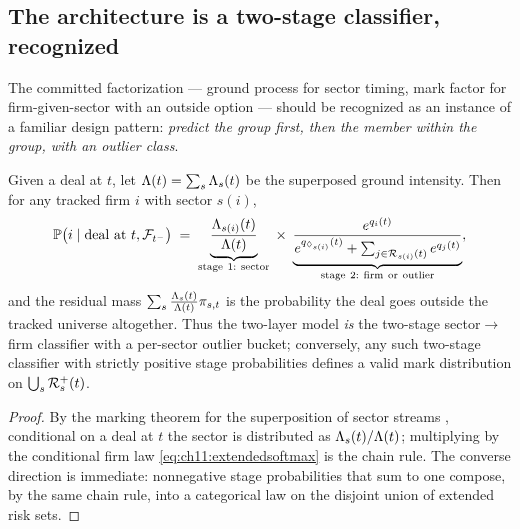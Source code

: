 \subsection{The architecture is a two-stage classifier, recognized}\label{ch11:sec:twostage}

The committed factorization --- ground process for sector timing, mark
factor for firm-given-sector with an outside option --- should be
recognized as an instance of a familiar design pattern: \emph{predict the
group first, then the member within the group, with an outlier class}.

\begin{proposition}\label{prop:ch11:twostage}
Given a deal at $t$, let $\Lambda(t) = \sum_{s} \Lambda_s(t)$ be the
superposed ground intensity. Then for any tracked firm $i$ with sector
$s(i)$,
\begin{equation}\label{eq:ch11:chain}
\mathbb{P}\big(i \mid \mathrm{deal\ at\ } t, \mathcal{F}_{t^-}\big)
 \;=\;
 \underbrace{\frac{\Lambda_{s(i)}(t)}{\Lambda(t)}}_{\mathrm{stage\ 1:\ sector}}
 \;\times\;
 \underbrace{\frac{e^{q_i(t)}}
   {e^{q_{\lozenge_{s(i)}}(t)} + \sum_{j\in\mathcal{R}_{s(i)}(t)} e^{q_j(t)}}}_{\mathrm{stage\ 2:\ firm\ or\ outlier}},
\end{equation}
and the residual mass $\sum_s \frac{\Lambda_s(t)}{\Lambda(t)}\pi_{s,t}$ is the
probability the deal goes outside the tracked universe altogether. Thus
the two-layer model \emph{is} the two-stage sector$\to$firm classifier
with a per-sector outlier bucket; conversely, any such two-stage
classifier with strictly positive stage probabilities defines a valid
mark distribution on $\bigcup_s \mathcal{R}^{+}_s(t)$.
\end{proposition}

\begin{proof}
By the marking theorem for the superposition of sector streams
\citep[Ch.~6]{daley2003}, conditional on a deal at $t$ the sector is
distributed as $\Lambda_s(t)/\Lambda(t)$; multiplying by the conditional firm
law \cref{eq:ch11:extendedsoftmax} is the chain rule. The converse
direction is immediate: nonnegative stage probabilities that sum to one
compose, by the same chain rule, into a categorical law on the disjoint
union of extended risk sets.
\end{proof}

